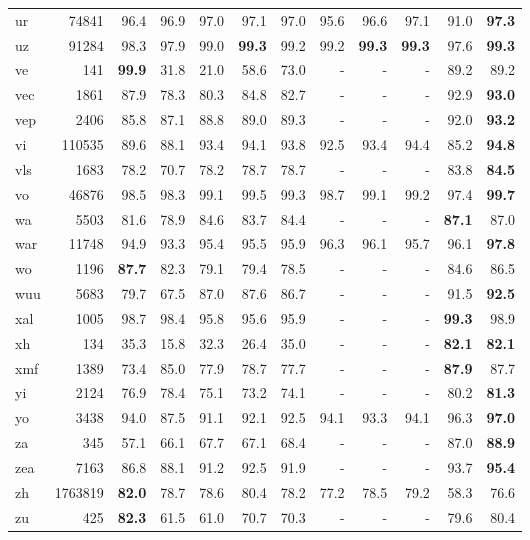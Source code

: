 \documentclass[11pt,a4paper]{article}
\begin{document}
\begin{supertabular}{lrrr|rrr|rrr|rr}
ur & 74841 & 96.4 & 96.9 & 97.0 & 97.1 & 97.0 & 95.6 & 96.6 & 97.1 & 91.0 & \textbf{97.3}\\
uz & 91284 & 98.3 & 97.9 & 99.0 & \textbf{99.3} & 99.2 & 99.2 & \textbf{99.3} & \textbf{99.3} & 97.6 & \textbf{99.3}\\
ve & 141 & \textbf{99.9} & 31.8 & 21.0 & 58.6 & 73.0 & - & - & - & 89.2 & 89.2\\
vec & 1861 & 87.9 & 78.3 & 80.3 & 84.8 & 82.7 & - & - & - & 92.9 & \textbf{93.0}\\
vep & 2406 & 85.8 & 87.1 & 88.8 & 89.0 & 89.3 & - & - & - & 92.0 & \textbf{93.2}\\
vi & 110535 & 89.6 & 88.1 & 93.4 & 94.1 & 93.8 & 92.5 & 93.4 & 94.4 & 85.2 & \textbf{94.8}\\
vls & 1683 & 78.2 & 70.7 & 78.2 & 78.7 & 78.7 & - & - & - & 83.8 & \textbf{84.5}\\
vo & 46876 & 98.5 & 98.3 & 99.1 & 99.5 & 99.3 & 98.7 & 99.1 & 99.2 & 97.4 & \textbf{99.7}\\
wa & 5503 & 81.6 & 78.9 & 84.6 & 83.7 & 84.4 & - & - & - & \textbf{87.1} & 87.0\\
war & 11748 & 94.9 & 93.3 & 95.4 & 95.5 & 95.9 & 96.3 & 96.1 & 95.7 & 96.1 & \textbf{97.8}\\
wo & 1196 & \textbf{87.7} & 82.3 & 79.1 & 79.4 & 78.5 & - & - & - & 84.6 & 86.5\\
wuu & 5683 & 79.7 & 67.5 & 87.0 & 87.6 & 86.7 & - & - & - & 91.5 & \textbf{92.5}\\
xal & 1005 & 98.7 & 98.4 & 95.8 & 95.6 & 95.9 & - & - & - & \textbf{99.3} & 98.9\\
xh & 134 & 35.3 & 15.8 & 32.3 & 26.4 & 35.0 & - & - & - & \textbf{82.1} & \textbf{82.1}\\
xmf & 1389 & 73.4 & 85.0 & 77.9 & 78.7 & 77.7 & - & - & - & \textbf{87.9} & 87.7\\
yi & 2124 & 76.9 & 78.4 & 75.1 & 73.2 & 74.1 & - & - & - & 80.2 & \textbf{81.3}\\
yo & 3438 & 94.0 & 87.5 & 91.1 & 92.1 & 92.5 & 94.1 & 93.3 & 94.1 & 96.3 & \textbf{97.0}\\
za & 345 & 57.1 & 66.1 & 67.7 & 67.1 & 68.4 & - & - & - & 87.0 & \textbf{88.9}\\
zea & 7163 & 86.8 & 88.1 & 91.2 & 92.5 & 91.9 & - & - & - & 93.7 & \textbf{95.4}\\
zh & 1763819 & \textbf{82.0} & 78.7 & 78.6 & 80.4 & 78.2 & 77.2 & 78.5 & 79.2 & 58.3 & 76.6\\
zu & 425 & \textbf{82.3} & 61.5 & 61.0 & 70.7 & 70.3 & - & - & - & 79.6 & 80.4\\
\end{supertabular}
 \label{tbl:wikiann-full-results}
\end{document}
